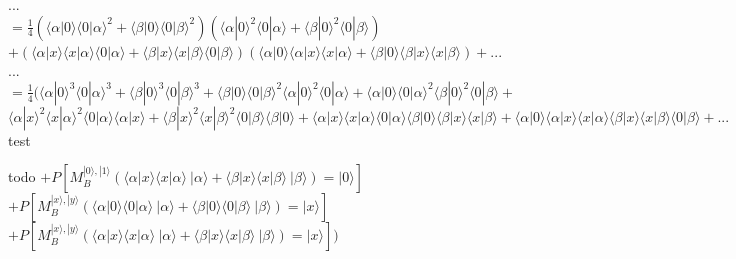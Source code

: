 \documentclass[a4paper]{scrartcl}
\begin{document}
\begin{enumerate}[a)]
...\\
$=\frac{1}{4} (\langle \alpha|0\rangle \langle 0|\alpha\rangle^2 + \langle \beta|0\rangle \langle 0|\beta\rangle^2) (\langle \alpha|0\rangle^2 \langle 0|\alpha\rangle + \langle \beta|0\rangle^2 \langle 0|\beta\rangle)$\\
$+(\langle \alpha|x\rangle \langle x|\alpha\rangle\langle 0|\alpha\rangle + \langle \beta|x\rangle \langle x|\beta\rangle\langle 0|\beta\rangle) (\langle \alpha|0\rangle\langle \alpha|x\rangle \langle x|\alpha\rangle + \langle \beta|0\rangle\langle \beta|x\rangle \langle x|\beta\rangle) +...$\\

...\\
$=\frac{1}{4} (\langle \alpha|0\rangle^3 \langle 0|\alpha\rangle^3 + \langle \beta|0\rangle^3 \langle 0|\beta\rangle^3 + \langle \beta|0\rangle \langle 0|\beta\rangle^2 \langle \alpha|0\rangle^2 \langle 0|\alpha\rangle + \langle \alpha|0\rangle \langle 0|\alpha\rangle^2 \langle \beta|0\rangle^2 \langle 0|\beta\rangle+$\\
$\langle \alpha|x\rangle^2 \langle x|\alpha\rangle^2\langle 0|\alpha\rangle\langle \alpha|x\rangle + \langle \beta|x\rangle^2 \langle x|\beta\rangle^2\langle 0|\beta\rangle\langle \beta|0\rangle + \langle \alpha|x\rangle \langle x|\alpha\rangle\langle 0|\alpha\rangle  \langle \beta|0\rangle\langle \beta|x\rangle \langle x|\beta\rangle + \langle \alpha|0\rangle\langle \alpha|x\rangle \langle x|\alpha\rangle \langle \beta|x\rangle \langle x|\beta\rangle\langle 0|\beta\rangle + ...$\\

test


todo
$+ P[M_B^{|0\rangle,|1\rangle}(\langle \alpha|x\rangle \langle x|\alpha\rangle~|\alpha\rangle + \langle \beta|x\rangle \langle x|\beta\rangle~|\beta\rangle)=|0\rangle]$\\
$+ P[M_B^{|x\rangle,|y\rangle}(\langle \alpha|0\rangle \langle 0|\alpha\rangle~|\alpha\rangle + \langle \beta|0\rangle \langle 0|\beta\rangle~|\beta\rangle)=|x\rangle]$\\
$+ P[M_B^{|x\rangle,|y\rangle}(\langle \alpha|x\rangle \langle x|\alpha\rangle~|\alpha\rangle + \langle \beta|x\rangle \langle x|\beta\rangle~|\beta\rangle)=|x\rangle])$\\





\end{enumerate}
\end{document}
